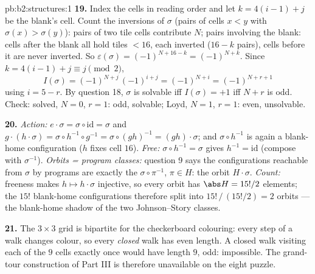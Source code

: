 \begin{solution}{pb:b2:structures:1}
\textbf{19.} Index the cells in reading order and let $k = 4(i -
1) + j$ be the blank's cell. Count the inversions of $\sigma$
(pairs of cells $x < y$ with $\sigma(x) > \sigma(y)$): pairs of
two tile cells contribute $N$; pairs involving the blank: cells
after the blank all hold tiles $< 16$, each inverted ($16 - k$
pairs), cells before it are never inverted. So
$\varepsilon(\sigma) = (-1)^{N + 16 - k} = (-1)^{N + k}$. Since
$k = 4(i-1) + j \equiv j \pmod 2$,
\[
I(\sigma) = (-1)^{N + j}\,(-1)^{i + j} = (-1)^{N + i}
= (-1)^{N + r + 1}
\]
using $i = 5 - r$. By question 18, $\sigma$ is solvable iff
$I(\sigma) = +1$ iff $N + r$ is odd. Check: solved, $N = 0$, $r
= 1$: odd, solvable; Loyd, $N = 1$, $r = 1$: even, unsolvable.

\textbf{20.} \emph{Action:} $e \cdot \sigma = \sigma \circ
\mathrm{id} = \sigma$ and $g \cdot (h \cdot \sigma) = \sigma
\circ h^{-1} \circ g^{-1} = \sigma \circ (gh)^{-1} = (gh) \cdot
\sigma$; and $\sigma \circ h^{-1}$ is again a blank-home
configuration ($h$ fixes cell $16$). \emph{Free:} $\sigma \circ
h^{-1} = \sigma$ gives $h^{-1} = \mathrm{id}$ (compose with
$\sigma^{-1}$). \emph{Orbits = program classes:} question 9
says the configurations reachable from $\sigma$ by programs are
exactly the $\sigma \circ \pi^{-1}$, $\pi \in H$: the orbit $H
\cdot \sigma$. \emph{Count:} freeness makes $h \mapsto h \cdot
\sigma$ injective, so every orbit has $\abs H = 15!/2$ elements;
the $15!$ blank-home configurations therefore split into
$15!\,/\,(15!/2) = 2$ orbits --- the blank-home shadow of the
two Johnson--Story classes.

\textbf{21.} The $3 \times 3$ grid is bipartite for the
checkerboard colouring: every step of a walk changes colour, so
every \emph{closed} walk has even length. A closed walk visiting
each of the $9$ cells exactly once would have length $9$, odd:
impossible. The grand-tour construction of Part III is therefore
unavailable on the eight puzzle.


\end{solution}
